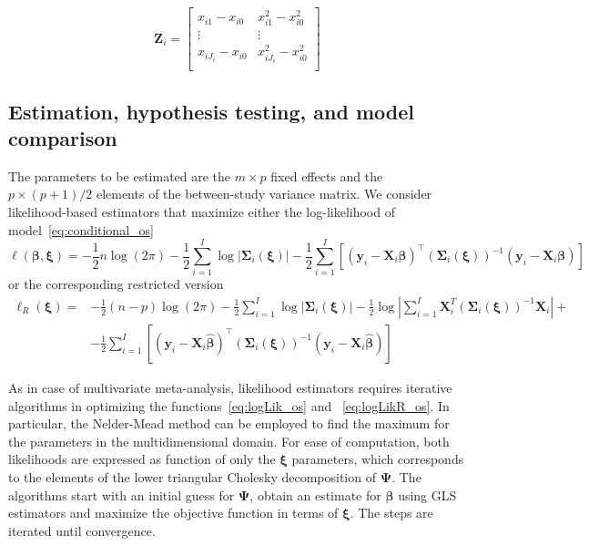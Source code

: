 \documentclass[11pt,a4paper,twoside,openany]{book}\usepackage{knitr}
\begin{document}
{\begin{equation*}
\mathbf{Z}_i =
	\begin{bmatrix}
		x_{i1} - x_{i0}  & x_{i1}^2 - x_{i0}^2 \\
		\vdots & \vdots \\
		x_{iJ_i} - x_{i0}  & x_{iJ_i}^2 - x_{i0}^2 \\
	\end{bmatrix}
\end{equation*} 

\subsection{Estimation, hypothesis testing, and model comparison}

The parameters to be estimated are the $m\times p$ fixed effects and the $p \times (p+1)/2$ elements of the between-study variance matrix. We consider likelihood-based estimators that maximize either the log-likelihood of model~\ref{eq:conditional_os}
\begin{equation}
\ell \left( \boldsymbol{\beta}, \boldsymbol{\xi} \right) = 
 -\frac{1}{2} n \log(2\pi)  -\frac{1}{2} \sum_{i=1}^I \log | \boldsymbol{\Sigma}_i \left( \boldsymbol{\xi} \right) |  -\frac{1}{2}\sum_{i=1}^I \left[ \left( \mathbf{y}_i -  \mathbf{X}_i \boldsymbol{\beta} \right)^\top \left( \boldsymbol{\Sigma}_i \left( \boldsymbol{\xi} \right) \right)^{-1} \left( \mathbf{y}_i -  \mathbf{X}_i \boldsymbol{\beta} \right) \right]
\label{eq:logLik_os}
\end{equation}
\noindent or the corresponding restricted version
\begin{equation}
\begin{split}
\ell_R \left( \boldsymbol{\xi} \right) = & 
 -\frac{1}{2} (n - p) \log(2\pi)  - \frac{1}{2} \sum_{i=1}^I \log | \boldsymbol{\Sigma}_i \left( \boldsymbol{\xi} \right) |  - \frac{1}{2} \log \left| \sum_{i=1}^I \mathbf{X}_i^T \left( \boldsymbol{\Sigma}_i \left( \boldsymbol{\xi} \right) \right)^{-1}  \mathbf{X}_i  \right| + \\
&-\frac{1}{2}\sum_{i=1}^I \left[ \left( \mathbf{y}_i -  \mathbf{X}_i \boldsymbol{\hat \beta} \right)^\top \left( \boldsymbol{\Sigma}_i \left( \boldsymbol{\xi} \right) \right)^{-1} \left( \mathbf{y}_i -  \mathbf{X}_i \boldsymbol{\hat \beta} \right) \right]
\end{split}
\label{eq:logLikR_os}
\end{equation}

\noindent As in case of multivariate meta-analysis, likelihood estimators requires iterative algorithms in optimizing the functions~\ref{eq:logLik_os} and ~\ref{eq:logLikR_os}. 
In particular, the Nelder-Mead method can be employed to find the maximum for the parameters in the multidimensional domain. For ease of computation, both likelihoods are expressed as function of only the $\boldsymbol{\xi}$ parameters, which corresponds to the elements of the lower triangular Cholesky decomposition of $\boldsymbol{\Psi}$. The algorithms start with an initial guess for $\boldsymbol{\Psi}$, obtain an estimate for $\boldsymbol{\beta}$ using GLS estimators and maximize the objective function in terms of $\boldsymbol{\xi}$. The steps are iterated until convergence.

}
\end{document}

